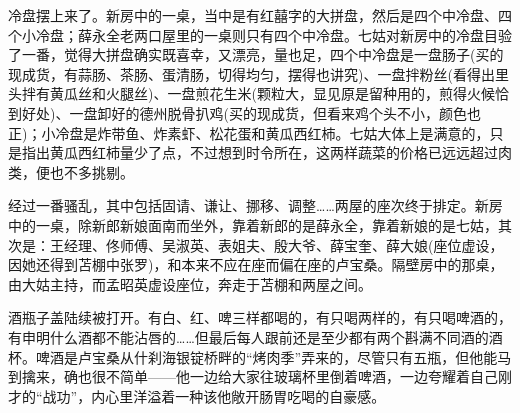 \par 冷盘摆上来了。新房中的一桌，当中是有红囍字的大拼盘，然后是四个中冷盘、四个小冷盘；薛永全老两口屋里的一桌则只有四个中冷盘。七姑对新房中的冷盘目验了一番，觉得大拼盘确实既喜幸，又漂亮，量也足，四个中冷盘是一盘肠子(买的现成货，有蒜肠、茶肠、蛋清肠，切得均匀，摆得也讲究)、一盘拌粉丝(看得出里头拌有黄瓜丝和火腿丝)、一盘煎花生米(颗粒大，显见原是留种用的，煎得火候恰到好处)、一盘卸好的德州脱骨扒鸡(买的现成货，但看来鸡个头不小，颜色也正)；小冷盘是炸带鱼、炸素虾、松花蛋和黄瓜西红柿。七姑大体上是满意的，只是指出黄瓜西红柿量少了点，不过想到时令所在，这两样蔬菜的价格已远远超过肉类，便也不多挑剔。
\par 经过一番骚乱，其中包括固请、谦让、挪移、调整……两屋的座次终于排定。新房中的一桌，除新郎新娘面南而坐外，靠着新郎的是薛永全，靠着新娘的是七姑，其次是：王经理、佟师傅、吴淑英、表姐夫、殷大爷、薛宝奎、薛大娘(座位虚设，因她还得到苫棚中张罗)，和本来不应在座而偏在座的卢宝桑。隔壁房中的那桌，由大姑主持，而孟昭英虚设座位，奔走于苫棚和两屋之间。
\par 酒瓶子盖陆续被打开。有白、红、啤三样都喝的，有只喝两样的，有只喝啤酒的，有申明什么酒都不能沾唇的……但最后每人跟前还是至少都有两个斟满不同酒的酒杯。啤酒是卢宝桑从什刹海银锭桥畔的“烤肉季”弄来的，尽管只有五瓶，但他能马到擒来，确也很不简单——他一边给大家往玻璃杯里倒着啤酒，一边夸耀着自己刚才的“战功”，内心里洋溢着一种该他敞开肠胃吃喝的自豪感。
